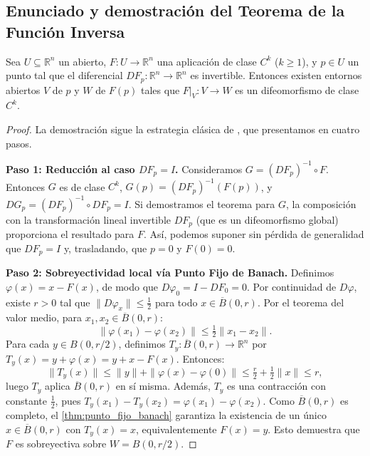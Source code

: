 \subsection{Enunciado y demostración del Teorema de la Función Inversa}

\begin{theorem}\label{thm:funcion_inversa}
Sea $U \subseteq \mathbb{R}^n$ un abierto, $F: U \to \mathbb{R}^n$ una aplicación de clase $C^k$ ($k \geq 1$), y $p \in U$ un punto tal que el diferencial $DF_p: \mathbb{R}^n \to \mathbb{R}^n$ es invertible. Entonces existen entornos abiertos $V$ de $p$ y $W$ de $F(p)$ tales que $F|_V: V \to W$ es un difeomorfismo de clase $C^k$.
\end{theorem}

\begin{proof}
La demostración sigue la estrategia clásica de \citet[Teorema~9.24]{Rudin1976}, que presentamos en cuatro pasos.

\textbf{Paso 1: Reducción al caso $DF_p = I$.}
Consideramos $G = (DF_p)^{-1} \circ F$. Entonces $G$ es de clase $C^k$, $G(p) = (DF_p)^{-1}(F(p))$, y $DG_p = (DF_p)^{-1} \circ DF_p = I$. Si demostramos el teorema para $G$, la composición con la transformación lineal invertible $DF_p$ (que es un difeomorfismo global) proporciona el resultado para $F$. Así, podemos suponer sin pérdida de generalidad que $DF_p = I$ y, trasladando, que $p = 0$ y $F(0) = 0$.

\textbf{Paso 2: Sobreyectividad local vía Punto Fijo de Banach.}
Definimos $\varphi(x) = x - F(x)$, de modo que $D\varphi_0 = I - DF_0 = 0$. Por continuidad de $D\varphi$, existe $r > 0$ tal que $\|D\varphi_x\| \leq \tfrac{1}{2}$ para todo $x \in \overline{B}(0, r)$. Por el teorema del valor medio, para $x_1, x_2 \in \overline{B}(0, r)$:
\[
\|\varphi(x_1) - \varphi(x_2)\| \leq \tfrac{1}{2} \|x_1 - x_2\|.
\]
Para cada $y \in B(0, r/2)$, definimos $T_y: \overline{B}(0, r) \to \mathbb{R}^n$ por $T_y(x) = y + \varphi(x) = y + x - F(x)$. Entonces:
\[
\|T_y(x)\| \leq \|y\| + \|\varphi(x) - \varphi(0)\| \leq \tfrac{r}{2} + \tfrac{1}{2}\|x\| \leq r,
\]
luego $T_y$ aplica $\overline{B}(0, r)$ en sí misma. Además, $T_y$ es una contracción con constante $\tfrac{1}{2}$, pues $T_y(x_1) - T_y(x_2) = \varphi(x_1) - \varphi(x_2)$. Como $\overline{B}(0, r)$ es completo, el \autoref{thm:punto_fijo_banach} garantiza la existencia de un único $x \in \overline{B}(0, r)$ con $T_y(x) = x$, equivalentemente $F(x) = y$. Esto demuestra que $F$ es sobreyectiva sobre $W = B(0, r/2)$.


\end{proof}
